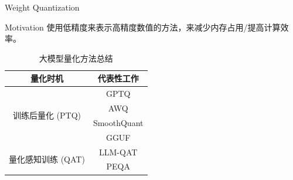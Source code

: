 \documentclass[aspectratio=169]{beamer}
\begin{document}
\begin{frame}{Weight Quantization}
    \begin{block}{Motivation}
        使用低精度来表示高精度数值的方法，来减少内存占用/提高计算效率。
    \end{block}

    \begin{table}[htbp]
        \centering
        \begin{tabular}{cc}  %
            \toprule
            \textbf{量化时机} & \textbf{代表性工作} \\
            \midrule
            \multirow{4}{*}{训练后量化 (PTQ)} & GPTQ\cite{frantar2023gptqaccurateposttrainingquantization} \\
                                             & AWQ\cite{lin2024awqactivationawareweightquantization} \\
                                             & SmoothQuant\cite{xiao2024smoothquantaccurateefficientposttraining} \\
                                             & GGUF\cite{ggerganov2023ggml} \\
            \midrule
            \multirow{2}{*}{量化感知训练 (QAT)} & LLM-QAT\cite{liu2023llmqatdatafreequantizationaware} \\
                                             & PEQA\cite{kim2023memoryefficientfinetuningcompressedlarge} \\
            \bottomrule
        \end{tabular}
        \caption{大模型量化方法总结}
        \label{tab:quantization_simple}
    \end{table}
\end{frame}
\end{document}
